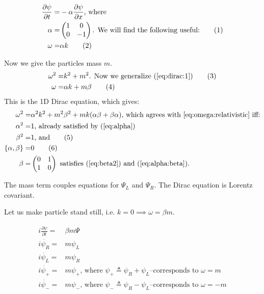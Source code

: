 \documentclass[]{article}
\newcommand\numberthis{\addtocounter{equation}{1}\tag{\theequation}}
\begin{document}
\begin{align*}
	\frac{\partial \psi}{\partial t} =& - \alpha \frac{\partial \psi}{\partial x} \text{, where}\\
	\alpha =& \begin{pmatrix}
		1&0\\
		0&-1
	\end{pmatrix} \text{. We will find the following useful:} \numberthis\label{eq:alpha}\\
	\omega =& \alpha k \numberthis \label{eq:dirac:1}
\end{align*}

Now we give the particles mass $m$.
\begin{align*}
	\omega^2 =& k^2 + m^2 \text{. Now we generalize (\ref{eq:dirac:1})} \numberthis \label{eq:omega:relativistic}\\
	\omega =& \alpha k + m \beta  \numberthis \label{eq:Dirac:1D}
\end{align*}
This is the 1D Dirac equation, which gives:
\begin{align*}
	\omega^2 =& \alpha^2 k^2 + m^2 \beta^2 + m k (\alpha \beta + \beta \alpha) \text{, which agrees with \eqref{eq:omega:relativistic} iff:}\\
	\alpha^2 =& 1 \text{, already satisfied by (\ref{eq:alpha})}\\
	\beta^2 =& 1 \text{, and}\numberthis \label{eq:beta2}\\ 
	\{\alpha,\beta\} =& 0 \numberthis \label{eq:alpha:beta}\\
	\beta =& \begin{pmatrix}
	0 & 1\\
	1 & 0
	\end{pmatrix} \text{ satisfies (\ref{eq:beta2}) and (\ref{eq:alpha:beta}).}
\end{align*}

The mass term couples equations for $\Psi_L$ and $\Psi_R$. The Dirac equation is Lorentz covariant.

Let us make particle stand still, i.e. $k=0 \implies \omega = \beta m$.

\begin{align*}
	i \frac{\partial \psi}{\partial t} =& \beta m \Psi\\
	i \dot{\psi_R} =& m \psi_L\\
	i \dot{\psi_L} =&  m \psi_R \\
	i \dot{\psi_+} =&  m \psi_+ \text{, where $\psi_+\triangleq\psi_R + \psi_L$--corresponds to $\omega=m$}\\
	i \dot{\psi_-} =&  m \psi_- \text{, where $\psi_-\triangleq\psi_R - \psi_L$--corresponds to $\omega=-m$}
\end{align*}
\end{document}
